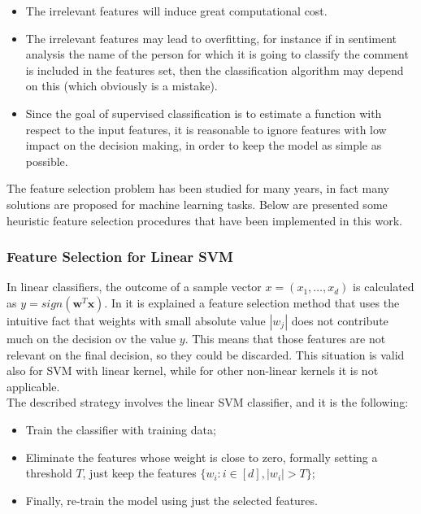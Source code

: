 \begin{itemize}
	\item The irrelevant features will induce great computational cost. 
	\item The irrelevant features may lead to overfitting, for instance if in sentiment analysis the name of the person for which it is going to classify the comment is included in the features set, then the classification algorithm may depend on this (which obviously is a mistake).
	\item Since the goal of supervised classification is to estimate a function with respect to the input features, it is reasonable to ignore features with low impact on the decision making, in order to keep the model as simple as possible.
\end{itemize}

The feature selection problem has been studied for many years, in fact many solutions are proposed for machine learning tasks. Below are presented some heuristic feature selection procedures that have been implemented in this work.


\subsubsection{Feature Selection for Linear SVM}

In linear classifiers, the outcome of a sample vector $x = (x_1, \dots, x_d)$ is calculated as $y=sign(\mathbf{w}^T\mathbf{x})$. In \cite{Brank2002FeatureSU} it is explained a feature selection method that uses the intuitive fact that weights with small absolute value $|w_j|$ does not contribute much on the decision ov the value $y$. This means that those features are not relevant on the final decision, so they could be discarded. This situation is valid also for SVM with linear kernel, while for other non-linear kernels it is not applicable.\\
The described strategy involves the linear \ac{SVM} classifier, and it is the following:
\begin{itemize}
	\item Train the classifier with training data;
	\item Eliminate the features whose weight is close to zero, formally setting a threshold $T$, just keep the features $\{w_i : i \in [d], |w_i| > T\}$;
	\item Finally, re-train the model using just the selected features.
\end{itemize}

